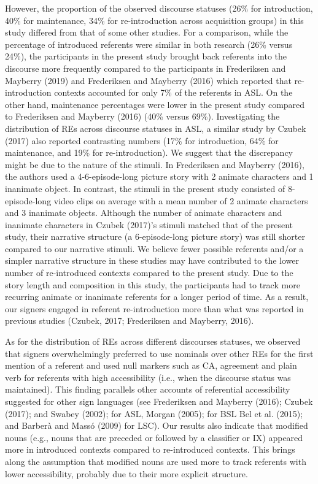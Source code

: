 \documentclass[]{elsarticle} %
\begin{document}
However, the proportion of the observed discourse statuses (26\% for
introduction, 40\% for maintenance, 34\% for re-introduction across
acquisition groups) in this study differed from that of some other
studies. For a comparison, while the percentage of introduced referents
were similar in both research (26\% versus 24\%), the participants in
the present study brought back referents into the discourse more
frequently compared to the participants in Frederiksen and Mayberry
(2019) and Frederiksen and Mayberry (2016) which reported that
re-introduction contexts accounted for only 7\% of the referents in ASL.
On the other hand, maintenance percentages were lower in the present
study compared to Frederiksen and Mayberry (2016) (40\% versus 69\%).
Investigating the distribution of REs across discourse statuses in ASL,
a similar study by Czubek (2017) also reported contrasting numbers (17\%
for introduction, 64\% for maintenance, and 19\% for re-introduction).
We suggest that the discrepancy might be due to the nature of the
stimuli. In Frederiksen and Mayberry (2016), the authors used a
4-6-episode-long picture story with 2 animate characters and 1 inanimate
object. In contrast, the stimuli in the present study consisted of
8-episode-long video clips on average with a mean number of 2 animate
characters and 3 inanimate objects. Although the number of animate
characters and inanimate characters in Czubek (2017)'s stimuli matched
that of the present study, their narrative structure (a 6-episode-long
picture story) was still shorter compared to our narrative stimuli. We
believe fewer possible referents and/or a simpler narrative structure in
these studies may have contributed to the lower number of re-introduced
contexts compared to the present study. Due to the story length and
composition in this study, the participants had to track more recurring
animate or inanimate referents for a longer period of time. As a result,
our signers engaged in referent re-introduction more than what was
reported in previous studies (Czubek, 2017; Frederiksen and Mayberry,
2016).

As for the distribution of REs across different discourses statuses, we
observed that signers overwhelmingly preferred to use nominals over
other REs for the first mention of a referent and used null markers such
as CA, agreement and plain verb for referents with high accessibility
(i.e., when the discourse status was maintained). This finding parallels
other accounts of referential accessibility suggested for other sign
languages (see Frederiksen and Mayberry (2016); Czubek (2017); and
Swabey (2002); for ASL, Morgan (2005); for BSL Bel et al. (2015); and
Barberà and Massó (2009) for LSC). Our results also indicate that
modified nouns (e.g., nouns that are preceded or followed by a
classifier or IX) appeared more in introduced contexts compared to
re-introduced contexts. This brings along the assumption that modified
nouns are used more to track referents with lower accessibility,
probably due to their more explicit structure.
\end{document}
